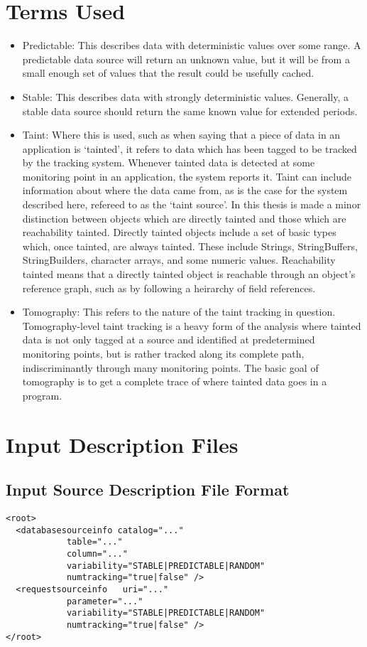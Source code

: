 \documentclass[msc,oneside]{ubcthesis}
\begin{document}
\chapter{Terms Used}
\label{cha:termsused}
\begin{itemize}
\item Predictable: This describes data with deterministic values over some range. A predictable data source will return an unknown value, but it will be from a small enough set of values that the result could be usefully cached.
\item Stable: This describes data with strongly deterministic values. Generally, a stable data source should return the same known value for extended periods.
\item Taint: Where this is used, such as when saying that a piece of data in an application is `tainted', it refers to data which has been tagged to be tracked by the tracking system. Whenever tainted data is detected at some monitoring point in an application, the system reports it. Taint can include information about where the data came from, as is the case for the system described here, refereed to as the `taint source'. In this thesis is made a minor distinction between objects which are directly tainted and those which are reachability tainted. Directly tainted objects include a set of basic types which, once tainted, are always tainted. These include Strings, StringBuffers, StringBuilders, character arrays, and some numeric values. Reachability tainted means that a directly tainted object is reachable through an object's reference graph, such as by following a heirarchy of field references.
\item Tomography: This refers to the nature of the taint tracking in question. Tomography-level taint tracking is a heavy form of the analysis where tainted data is not only tagged at a source and identified at predetermined monitoring points, but is rather tracked along its complete path, indiscriminantly through many monitoring points. The basic goal of tomography is to get a complete trace of where tainted data goes in a program. 
\end{itemize}

\chapter{Input Description Files}
\label{cha:idf}

\section{Input Source Description File Format}
\begin{verbatim}
<root>
  <databasesourceinfo catalog="..." 
            table="..." 
            column="..." 
            variability="STABLE|PREDICTABLE|RANDOM"
            numtracking="true|false" />
  <requestsourceinfo   uri="..." 
            parameter="..."
            variability="STABLE|PREDICTABLE|RANDOM"
            numtracking="true|false" />
</root>
\end{verbatim}
\end{document}
